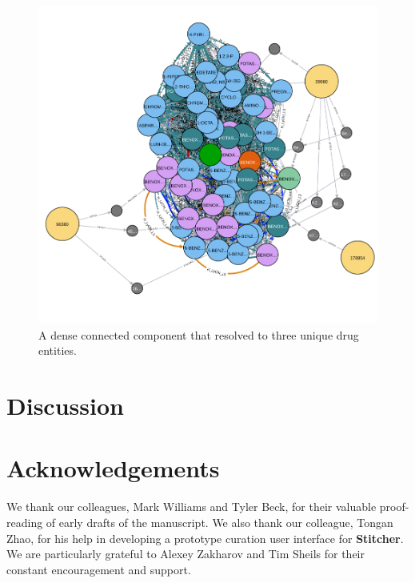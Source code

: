 \documentclass{bioinfo}
\newcommand\st{\textbf{Stitcher}}
\begin{document}
\begin{figure}[!tpb]
\centerline{\includegraphics[scale=0.5]{graph4-crop}}
\caption{A dense connected component that resolved to three unique
drug entities.}\label{fig:graph2}  
\end{figure}

\section{Discussion}

\section*{Acknowledgements}
We thank our colleagues, Mark Williams and Tyler Beck, for their
valuable proof-reading of early drafts of the manuscript. We also
thank our colleague, Tongan Zhao, for his help in developing a
prototype curation user interface for \st. We are particularly grateful
to Alexey Zakharov and Tim Sheils for their constant encouragement and
support.


%
%
%
%
%
%
%

\end{document}
